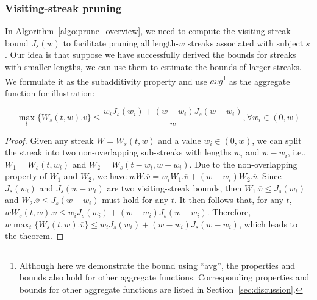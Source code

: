 \subsubsection{Visiting-streak pruning}  
\label{sec:visiting-window-bound}
In Algorithm~\ref{algo:prune_overview}, we need to compute the visiting-streak bound $J_s(w)$ to facilitate pruning all length-$w$ streaks associated with subject $s$. Our idea is that suppose we have successfully derived the bounds for streaks with smaller lengths, we can use them to estimate the bounds of larger streaks. We formulate it as the subadditivity property and use $avg$\footnote{Although here we demonstrate the bound
using ``avg'', the properties and bounds also hold for other aggregate functions. Corresponding properties and bounds for other aggregate functions are listed in Section~\ref{sec:discussion}.
} as the aggregate function for illustration: 

\begin{theorem}
\label{lem:subaverage}
\begin{equation}
\label{eq:subadditivity}
	\max_t\{W_s(t,w).\overline{v}\} \leq \frac{w_i J_s(w_i) + (w-w_i) J_s(w-w_i)}{w}, \forall w_i \in (0,w)
\end{equation}
\end{theorem}
\begin{proof}
Given any streak $W=W_s(t,w)$ and a value $w_i \in (0,w)$, we can split the streak into two non-overlapping sub-streaks with lengths $w_i$ and $w-w_i$, i.e., $W_1 = W_s(t,w_i)$ and $W_2 = W_s(t-w_i, w-w_i)$. Due to the non-overlapping property of $W_1$ and $W_2$, we have $wW.\overline{v} = w_iW_1.\overline{v} + (w-w_i)W_2.\overline{v}$.  Since $J_s(w_i)$ and $J_s(w-w_i)$ are two visiting-streak bounds, then $W_1.\overline{v}\leq J_s(w_i)$ and $W_2.\overline{v}\leq J_s(w-w_i)$ must hold for any $t$. 
It then follows that, for any $t$, $wW_s(t,w).\overline{v} \leq w_i J_s(w_i) + (w-w_i) J_s(w-w_i)$. Therefore, $w\max_t\{W_s(t,w).\overline{v}\} \leq w_i J_s(w_i) + (w-w_i) J_s(w-w_i)$,  which leads to the theorem. %
\end{proof}





